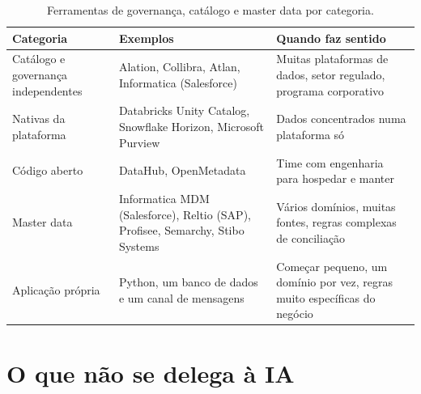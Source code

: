 
\begin{table}[htbp]
  \centering
  \caption{Ferramentas de governança, catálogo e master data por categoria.}
  \label{tab:ferramentas-governanca}
  \small
  \begin{tabularx}{\textwidth}{@{}>{\raggedright\arraybackslash}p{}
      >{\raggedright\arraybackslash}X>{\raggedright\arraybackslash}X@{}}
    \toprule
    Categoria & Exemplos & Quando faz sentido \\
    \midrule
    Catálogo e governança independentes & Alation, Collibra, Atlan, Informatica (Salesforce) & Muitas plataformas de dados, setor regulado, programa corporativo \\
    \addlinespace
    Nativas da plataforma & Databricks Unity Catalog, Snowflake Horizon, Microsoft Purview & Dados concentrados numa plataforma só \\
    \addlinespace
    Código aberto & DataHub, OpenMetadata & Time com engenharia para hospedar e manter \\
    \addlinespace
    Master data & Informatica MDM (Salesforce), Reltio (SAP), Profisee, Semarchy, Stibo Systems & Vários domínios, muitas fontes, regras complexas de conciliação \\
    \addlinespace
    Aplicação própria & Python, um banco de dados e um canal de mensagens & Começar pequeno, um domínio por vez, regras muito específicas do negócio \\
    \bottomrule
  \end{tabularx}
\end{table}

\section{O que não se delega à IA}
\label{sec:gov-nao-delegar}


